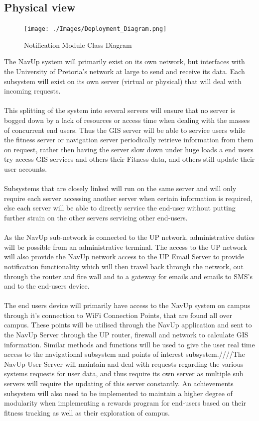 \documentclass{article}
\begin{document}
		\newpage
		\subsection{Physical view}
	
			\begin{figure}[h]
				\texttt{[image: ./Images/Deployment\_Diagram.png]} 
				\caption{Notification Module Class Diagram}
			\end{figure}
			
			{The NavUp system will primarily exist on its own network, but interfaces with the University of Pretoria's network at large to send and receive its data. Each subsystem will exist on its own server (virtual or physical) that will deal with incoming requests.\\\\This splitting of the system into several servers will ensure that no server is bogged down by a lack of resources or access time when dealing with the masses of concurrent end users. Thus the GIS server will be able to service users while the fitness server or navigation server periodically retrieve information from them on request, rather then having the server slow down under huge loads a end users try access GIS services and others their Fitness data, and others still update their user accounts.\\\\Subsystems that are closely linked will run on the same server and will only require each server accessing another server when certain information is required, else each server will be able to directly service the end-user without putting further strain on the other servers servicing other end-users.\\\\As the NavUp sub-network is connected to the UP network, administrative duties will be possible from an administrative terminal. The access to the UP network will also provide the NavUp network access to the UP Email Server to provide notification functionality which will then travel back through the network, out through the router and fire wall and to a gateway for emails and emails to SMS's and to the end-users device.\\\\The end users device will primarily have access to the NavUp system on campus through it's connection to WiFi Connection Points, that are found all over campus. These points will be utilised through the NavUp application and sent to the NavUp Server through the UP router, firewall and network to calculate GIS information. Similar methods and functions will be used to give the user real time access to the navigational subsystem and points of interest subsystem.////The NavUp User Server will maintain and deal with requests regarding the various systems requests for user data, and thus require its own server as multiple sub servers will require the updating of this server constantly. An achievements subsystem will also need to be implemented to maintain a higher degree of modularity when implementing a rewards program for end-users based on their fitness tracking as well as their exploration of campus.}
\end{document}
